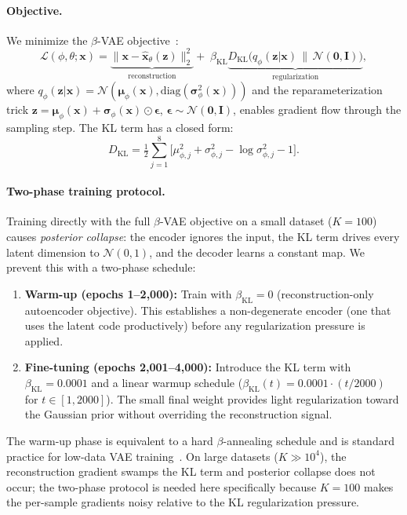 \paragraph{Objective.}
We minimize the $\beta$-VAE objective~\cite{higginsBetaVAELearningBasic2017}:
\begin{equation}
  \mathcal{L}(\phi,\theta;\mathbf{x})
  = \underbrace{\bigl\lVert\mathbf{x}-\hat{\mathbf{x}}_\theta(\mathbf{z})\bigr\rVert_2^2}
    _{\text{reconstruction}}
  +\; \beta_{\mathrm{KL}}\underbrace{D_{\mathrm{KL}}\!\bigl(
    q_\phi(\mathbf{z}|\mathbf{x})\,\big\|\,\mathcal{N}(\mathbf{0},\mathbf{I})\bigr)}
    _{\text{regularization}},
\label{eq:vae-elbo}
\end{equation}
where $q_\phi(\mathbf{z}|\mathbf{x})=\mathcal{N}(\boldsymbol{\mu}_\phi(\mathbf{x}),
\mathrm{diag}(\boldsymbol{\sigma}^2_\phi(\mathbf{x})))$ and the reparameterization trick
$\mathbf{z}=\boldsymbol{\mu}_\phi(\mathbf{x})+\boldsymbol{\sigma}_\phi(\mathbf{x})\odot
\boldsymbol{\epsilon}$, $\boldsymbol{\epsilon}\sim\mathcal{N}(\mathbf{0},\mathbf{I})$,
enables gradient flow through the sampling step.
The KL term has a closed form:
\begin{equation}
  D_{\mathrm{KL}} = \tfrac{1}{2}\sum_{j=1}^{8}\bigl[
    \mu_{\phi,j}^2+\sigma_{\phi,j}^2 - \log\sigma_{\phi,j}^2 - 1\bigr].
\end{equation}

\paragraph{Two-phase training protocol.}
Training directly with the full $\beta$-VAE objective on a small dataset ($K{=}100$)
causes \emph{posterior collapse}: the encoder ignores the input, the KL term drives every
latent dimension to $\mathcal{N}(0,1)$, and the decoder learns a constant map.
We prevent this with a two-phase schedule:
\begin{enumerate}
  \item \textbf{Warm-up (epochs 1--2{,}000):} Train with $\beta_{\mathrm{KL}}{=}0$
    (reconstruction-only autoencoder objective). This establishes a non-degenerate
    encoder (one that uses the latent code productively) before any regularization pressure
    is applied.
  \item \textbf{Fine-tuning (epochs 2{,}001--4{,}000):} Introduce the KL term with
    $\beta_{\mathrm{KL}}{=}0.0001$ and a linear warmup schedule
    ($\beta_{\mathrm{KL}}(t) = 0.0001\cdot(t/2000)$ for $t\in[1,2000]$).
    The small final weight provides light regularization toward the Gaussian prior without
    overriding the reconstruction signal.
\end{enumerate}
The warm-up phase is equivalent to a hard $\beta$-annealing schedule and is standard practice
for low-data VAE training~\cite{lucasHowAvoidTrivial2019}.
On large datasets ($K\gg10^4$), the reconstruction gradient swamps the KL term and posterior
collapse does not occur; the two-phase protocol is needed here specifically because
$K{=}100$ makes the per-sample gradients noisy relative to the KL regularization pressure.

